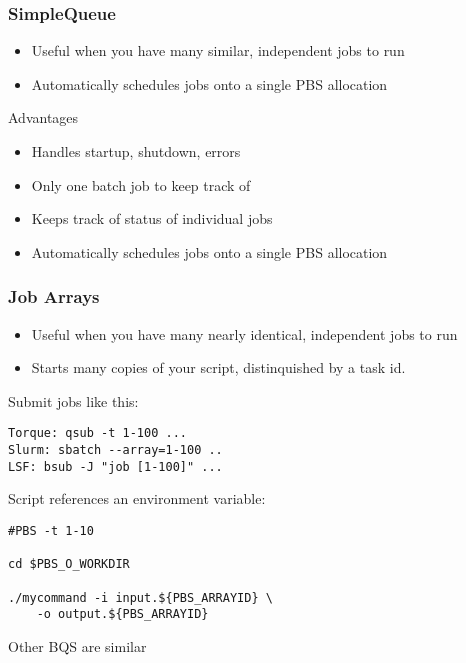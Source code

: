 \documentclass[10pt]{beamer}
\begin{document}
\begin{frame}[fragile]
\frametitle{SimpleQueue}

\begin{itemize}
\item Useful when you have many similar, independent jobs to run
\item Automatically schedules jobs onto a single PBS allocation
\end{itemize}

Advantages

\begin{itemize}
\item Handles startup, shutdown, errors
\item Only one batch job to keep track of
\item Keeps track of status of individual jobs
\item Automatically schedules jobs onto a single PBS allocation
\end{itemize}

\end{frame}

\begin{frame}[fragile]
\frametitle{Job Arrays}

\begin{itemize}
\item Useful when you have many nearly identical, independent jobs to run
\item Starts many copies of your script, distinquished by a task id.
\end{itemize}

Submit jobs like this:
\begin{verbatim}
Torque: qsub -t 1-100 ...
Slurm: sbatch --array=1-100 ..
LSF: bsub -J "job [1-100]" ...
\end{verbatim}

Script references an environment variable:
\begin{verbatim}
#PBS -t 1-10

cd $PBS_O_WORKDIR

./mycommand -i input.${PBS_ARRAYID} \
    -o output.${PBS_ARRAYID}
\end{verbatim}
Other BQS are similar
\end{frame}
\end{document}
